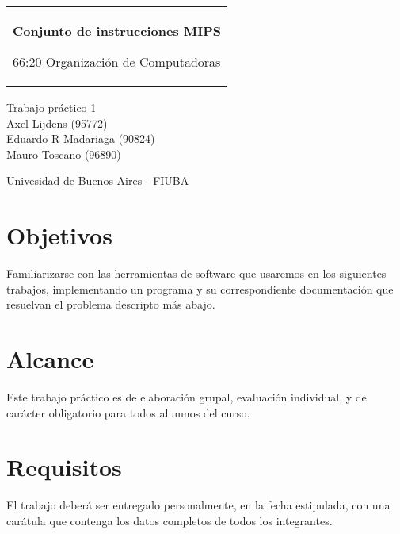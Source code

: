\documentclass[11pt,a4paper]{article}
\begin{document}

\begin{titlepage}
  \noindent%
  \begin{tabular}{@{}p{\textwidth}@{}}
    \vspace{0.2cm}
    \begin{center}
    \Huge{\textbf{
      Conjunto de instrucciones MIPS
    }}
    \end{center}
    \begin{center}
      \Large{
         66:20 Organización de Computadoras
      }
    \end{center}
    \vspace{0.2cm}\\
  \end{tabular}
  \vspace{4 cm}
  \begin{center}
    {\large
      Trabajo práctico 1
    }\\
    \vspace{0.6cm}
    {\Large
      Axel Lijdens (95772)\\
      Eduardo R Madariaga (90824)\\
      Mauro Toscano (96890)
    }
  \end{center}
  \vfill
  \begin{center}
  Univesidad de Buenos Aires - FIUBA
  \end{center}
\end{titlepage}


\tableofcontents
\pagebreak

\section{Objetivos}

Familiarizarse con las herramientas de software que usaremos en los siguientes trabajos,
implementando un programa y su correspondiente documentación que resuelvan el problema
descripto más abajo.

\section{Alcance}

Este trabajo práctico es de elaboración grupal, evaluación individual, y de carácter obligatorio para todos alumnos del curso.

\section{Requisitos}
El trabajo deber\'a ser entregado personalmente, en la fecha estipulada, con una car\'atula que contenga los datos completos de todos los integrantes.\\
\end{document}
